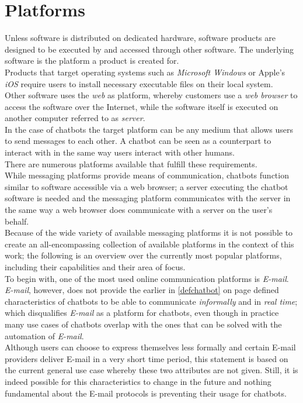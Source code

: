 \section{Platforms}
\label{platforms}


Unless software is distributed on dedicated hardware, software products are designed to be executed by and accessed through other software.
The underlying software is the platform a product is created for.
\\
Products that target operating systems such as \emph{Microsoft Windows} or Apple's \emph{iOS} require users to install necessary executable files on their local system.
\\
Other software uses the \emph{web} as platform, whereby customers use a \emph{web browser} to access the software over the Internet,
while the software itself is executed on another computer referred to as \emph{server}.
\\

In the case of chatbots the target platform can be any medium that allows users to send messages to each other.
A chatbot can be seen as a counterpart to interact with in the same way users interact with other humans.
\\

There are numerous platforms available that fulfill these requirements.
\\

While messaging platforms provide means of communication, chatbots function similar to software accessible via a web browser;
a server executing the chatbot software is needed and the messaging platform communicates with the server in the same way a web browser does communicate with a server on the user's behalf.
\\

Because of the wide variety of available messaging platforms it is not possible to create an all-encompassing collection of available platforms in the context of this work;
the following is an overview over the currently most popular platforms, including their capabilities and their area of focus.
\\

To begin with, one of the most used online communication platforms is \emph{E-mail}.
\\
\emph{E-mail}, however, does not provide the earlier in \ref{defchatbot} on page \pageref{defchatbot} defined characteristics of chatbots to be able to communicate \emph{informally} and in \emph{real time};
which disqualifies \emph{E-mail} as a platform for chatbots, even though in practice many use cases of chatbots overlap with the ones that can be solved with the automation of \emph{E-mail}.
\\
Although users can choose to express themselves less formally and certain E-mail providers deliver E-mail in a very short time period,
this statement is based on the current general use case whereby these two attributes are not given.
Still, it is indeed possible for this characteristics to change in the future
and nothing fundamental about the E-mail protocols is preventing their usage for chatbots.
\\

